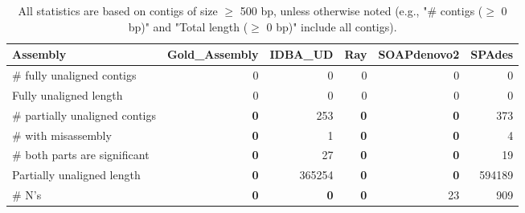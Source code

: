\documentclass[12pt,a4paper]{article}
\begin{document}
\begin{table}[ht]
\begin{center}
\caption{All statistics are based on contigs of size $\geq$ 500 bp, unless otherwise noted (e.g., "\# contigs ($\geq$ 0 bp)" and "Total length ($\geq$ 0 bp)" include all contigs).}
\begin{tabular}{|l*{5}{|r}|}
\hline
Assembly & Gold\_Assembly & IDBA\_UD & Ray & SOAPdenovo2 & SPAdes \\ \hline
\# fully unaligned contigs & 0 & 0 & 0 & 0 & 0 \\ \hline
Fully unaligned length & 0 & 0 & 0 & 0 & 0 \\ \hline
\# partially unaligned contigs & {\bf 0} & 253 & {\bf 0} & {\bf 0} & 373 \\ \hline
\hspace{5mm}\# with misassembly & {\bf 0} & 1 & {\bf 0} & {\bf 0} & 4 \\ \hline
\hspace{5mm}\# both parts are significant & {\bf 0} & 27 & {\bf 0} & {\bf 0} & 19 \\ \hline
Partially unaligned length & {\bf 0} & 365254 & {\bf 0} & {\bf 0} & 594189 \\ \hline
\# N's & {\bf 0} & {\bf 0} & {\bf 0} & 23 & 909 \\ \hline
\end{tabular}
\end{center}
\end{table}
\end{document}
